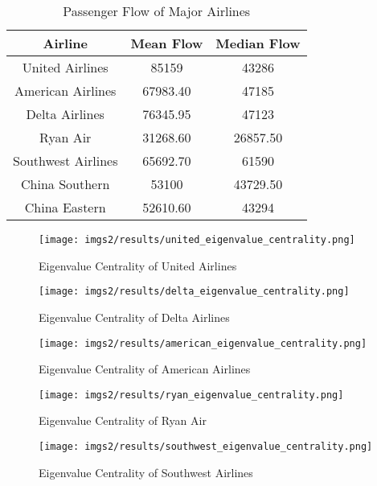 \documentclass[twocolumn]{tum-article}
\begin{document}
\begin{table}[ht]
\begin{center}
 \begin{tabular}{| c | c | c |}
 \hline
 \textbf{Airline} & \textbf{Mean Flow} & \textbf{Median Flow} \\ [0.5ex]
 \hline
 United Airlines & 85159 & 43286 \\
 \hline
 American Airlines & 67983.40 & 47185 \\
 \hline
 Delta Airlines & 76345.95  & 47123 \\
 \hline
 Ryan Air & 31268.60 & 26857.50 \\
 \hline
 Southwest Airlines & 65692.70  & 61590 \\
 \hline
 China Southern & 53100  & 43729.50 \\
 \hline
 China Eastern & 52610.60  & 43294 \\
 \hline
 \end{tabular}
\caption{Passenger Flow of Major Airlines}
\label{Tab:passenger_flow_airlines}
\end{center}
\end{table}

\begin{figure}
        \centering
        \texttt{[image: imgs2/results/united\_eigenvalue\_centrality.png]}
        \caption{
Eigenvalue Centrality of United Airlines}
        \label{fig:united_air_ec}
\end{figure}

\begin{figure}
        \centering
        \texttt{[image: imgs2/results/delta\_eigenvalue\_centrality.png]}
        \caption{
Eigenvalue Centrality of Delta Airlines}
        \label{fig:delta_air_ec}
\end{figure}


\begin{figure}
        \centering
        \texttt{[image: imgs2/results/american\_eigenvalue\_centrality.png]}
        \caption{
Eigenvalue Centrality of American Airlines}
        \label{fig:american_air_ec}
\end{figure}


\begin{figure}
        \centering
        \texttt{[image: imgs2/results/ryan\_eigenvalue\_centrality.png]}
        \caption{
Eigenvalue Centrality of Ryan Air}
        \label{fig:ryan_air_ec}
\end{figure}


\begin{figure}
        \centering
        \texttt{[image: imgs2/results/southwest\_eigenvalue\_centrality.png]}
        \caption{
Eigenvalue Centrality of Southwest Airlines}
        \label{fig:southwest_air_ec}
\end{figure}
\end{document}

